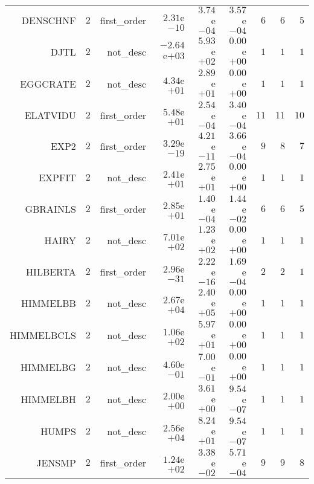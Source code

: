 \begin{longtable}{rrrrrrrrr}
DENSCHNF & \(     2\) & first\_order & \( 2.31\)e\(-10\) & \( 3.74\)e\(-04\) & \( 3.57\)e\(-04\) & \(     6\) & \(     6\) & \(     5\) \\
DJTL & \(     2\) & not\_desc & \(-2.64\)e\(+03\) & \( 5.93\)e\(+02\) & \( 0.00\)e\(+00\) & \(     1\) & \(     1\) & \(     1\) \\
EGGCRATE & \(     2\) & not\_desc & \( 4.34\)e\(+01\) & \( 2.89\)e\(+01\) & \( 0.00\)e\(+00\) & \(     1\) & \(     1\) & \(     1\) \\
ELATVIDU & \(     2\) & first\_order & \( 5.48\)e\(+01\) & \( 2.54\)e\(-04\) & \( 3.40\)e\(-04\) & \(    11\) & \(    11\) & \(    10\) \\
EXP2 & \(     2\) & first\_order & \( 3.29\)e\(-19\) & \( 4.21\)e\(-11\) & \( 3.66\)e\(-04\) & \(     9\) & \(     8\) & \(     7\) \\
EXPFIT & \(     2\) & not\_desc & \( 2.41\)e\(+01\) & \( 2.75\)e\(+01\) & \( 0.00\)e\(+00\) & \(     1\) & \(     1\) & \(     1\) \\
GBRAINLS & \(     2\) & first\_order & \( 2.85\)e\(+01\) & \( 1.40\)e\(-04\) & \( 1.44\)e\(-02\) & \(     6\) & \(     6\) & \(     5\) \\
HAIRY & \(     2\) & not\_desc & \( 7.01\)e\(+02\) & \( 1.23\)e\(+02\) & \( 0.00\)e\(+00\) & \(     1\) & \(     1\) & \(     1\) \\
HILBERTA & \(     2\) & first\_order & \( 2.96\)e\(-31\) & \( 2.22\)e\(-16\) & \( 1.69\)e\(-04\) & \(     2\) & \(     2\) & \(     1\) \\
HIMMELBB & \(     2\) & not\_desc & \( 2.67\)e\(+04\) & \( 2.40\)e\(+05\) & \( 0.00\)e\(+00\) & \(     1\) & \(     1\) & \(     1\) \\
HIMMELBCLS & \(     2\) & not\_desc & \( 1.06\)e\(+02\) & \( 5.97\)e\(+01\) & \( 0.00\)e\(+00\) & \(     1\) & \(     1\) & \(     1\) \\
HIMMELBG & \(     2\) & not\_desc & \( 4.60\)e\(-01\) & \( 7.00\)e\(-01\) & \( 0.00\)e\(+00\) & \(     1\) & \(     1\) & \(     1\) \\
HIMMELBH & \(     2\) & not\_desc & \( 2.00\)e\(+00\) & \( 3.61\)e\(+00\) & \( 9.54\)e\(-07\) & \(     1\) & \(     1\) & \(     1\) \\
HUMPS & \(     2\) & not\_desc & \( 2.56\)e\(+04\) & \( 8.24\)e\(+01\) & \( 9.54\)e\(-07\) & \(     1\) & \(     1\) & \(     1\) \\
JENSMP & \(     2\) & first\_order & \( 1.24\)e\(+02\) & \( 3.38\)e\(-02\) & \( 5.71\)e\(-04\) & \(     9\) & \(     9\) & \(     8\) \\

\end{longtable}
